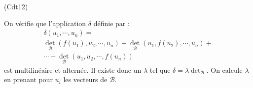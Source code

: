 \begin{tiny}(Cdt12)\end{tiny} On vérifie que l'application $\delta$ définie par :
\begin{multline*}
\delta(u_1,\cdots,u_n)= \\
 \det_\mathcal B(f(u_1),u_2,\cdots,u_n)
+ \det_\mathcal B(u_1,f(u_2),\cdots,u_n) + \\ \cdots + 
\det_\mathcal B(u_1,u_2,\cdots,f(u_n))
\end{multline*}
est multilinéaire et alternée. Il existe donc un $\lambda$ tel que $\delta = \lambda \det_\mathcal B$. On calcule $\lambda$ en prenant pour $u_i$ les vecteurs de $\mathcal B$.